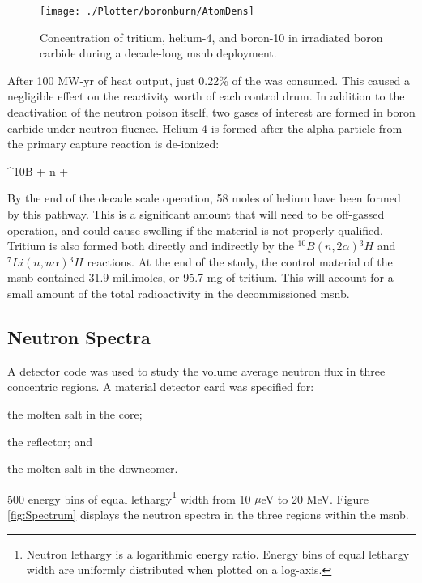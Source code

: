 \begin{figure}[ht!]
    \centering
    \texttt{[image: ./Plotter/boronburn/AtomDens]}
    \caption[\acs{msnb} Irradiated Boron Carbide]{Concentration of tritium, helium-4, and boron-10 in irradiated boron carbide during a decade-long \acs{msnb} deployment.}
    \label{fig:BoronBurn}
\end{figure}

After 100 MW-yr of heat output, just 0.22\% of the \B[10] was consumed. This caused a negligible effect on the reactivity worth of each control drum. In addition to the deactivation of the neutron poison itself, two gases of interest are formed in boron carbide under neutron fluence. Helium-4 is formed after the alpha particle from the primary capture reaction is de-ionized:

\begin{reaction} \label{rxn:B10cap}
    ^{10}B + n  + \alpha
\end{reaction}

By the end of the decade scale operation, 58 moles of helium have been formed by this pathway. This is a significant amount that will need to be off-gassed operation, and could cause swelling if the material is not properly qualified. Tritium is also formed both directly and indirectly by the $^{10}B(n,2\alpha){^{3}H}$ and $^{7}Li(n,n\alpha){^{3}H}$ reactions. At the end of the study, the control material of the \acs{msnb} contained 31.9 millimoles, or 95.7 mg of tritium. This will account for a small amount of the total radioactivity in the decommissioned \acs{msnb}.

\subsection{Neutron Spectra}
A detector code was used to study the volume average neutron flux in three concentric regions. A material detector card was specified for:
\begin{enumerate*}
    \item the molten salt in the core;
    \item the reflector; and
    \item the molten salt in the downcomer.
\end{enumerate*}
500 energy bins of equal lethargy\footnote{Neutron lethargy is a logarithmic energy ratio. Energy bins of equal lethargy width are uniformly distributed when plotted on a log-axis.} width from 10 $\mu$eV to 20 MeV. Figure \ref{fig:Spectrum} displays the neutron spectra in the three regions within the \acs{msnb}.

